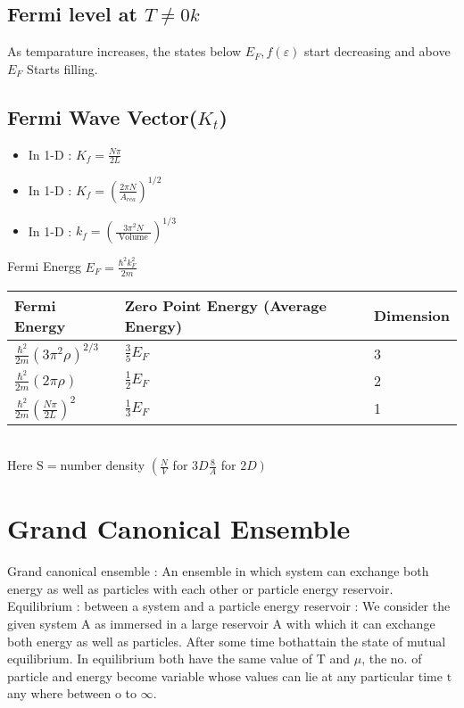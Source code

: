 \subsection{Fermi level at $T \neq 0 k$}
As temparature increases, the states below $E_{F}, f(\varepsilon)$ start decreasing and above $E_{F}$ Starts filling.
\subsection{Fermi Wave Vector($K_t$)}
\begin{itemize}
	\item In 1-D : $K_{f}=\frac{N \pi}{2 L}$
	\item  In 1-D : $K_{f}=\left(\frac{2 \pi N}{A_{r e a}}\right)^{1 / 2}$
	\item  In 1-D : $k_{f}=\left(\frac{3 \pi^{2} N}{\text { Volume }}\right)^{1 / 3}$
\end{itemize}
Fermi Energg $E_{F}=\frac{\hbar^{2} k_{F}^{2}}{2 m}$\\
\renewcommand*{\arraystretch}{2}
\begin{tabular}{|p{4cm}|p{4cm}|p{3cm}|}
	\hline
Fermi Energy&Zero Point Energy (Average Energy)&Dimension\\\hline
$\frac{\hbar^{2}}{2 m}\left(3 \pi^{2} \rho\right)^{2 / 3}$&$\frac{3}{5} E_{F}$&3\\
$\frac{\hbar^{2}}{2 m}(2 \pi \rho)$&$\frac{1}{2} E_{F}$&2\\
$\frac{\hbar^{2}}{2 m}\left(\frac{N \pi}{2 L}\right)^{2}$&$\frac{1}{3} E_{F}$& 1\\\hline
\end{tabular}\\
Here $\mathrm{S}=$number density $\left(\frac{N}{V}\right.$ for $3 D \frac{8}{A}$ for $\left.2 D\right)$
\section{Grand Canonical Ensemble}
Grand canonical ensemble : An ensemble in which system can exchange both energy as well as particles with each other or particle energy reservoir.\\
Equilibrium : between a system and a particle energy reservoir :
We consider the given system A as immersed in a large reservoir A with which it can exchange both energy as well as particles. After some time bothattain the state of mutual equilibrium. In equilibrium both have the same value of $\mathrm{T}$ and $\mu$, the no. of particle and energy become variable whose values can lie at any particular time $\mathrm{t}$ any where between o to $\infty$. 

